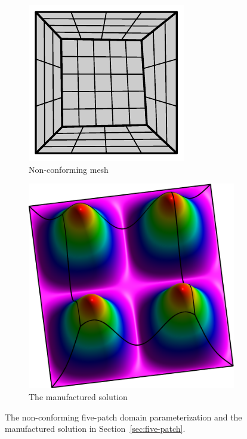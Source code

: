\begin{figure}[ht]
	\centering
	\begin{subfigure}[b]{0.33\textwidth}
		\includegraphics[width=\textwidth]{five_patch_basic}
		\caption{Non-conforming mesh}
	\end{subfigure}
	\begin{subfigure}[b]{0.34\textwidth}
		\includegraphics[width=\textwidth]{five_patch_solution-plot}
		\caption{The manufactured solution}
	\end{subfigure}
	\caption{The non-conforming five-patch domain parameterization and the manufactured solution in Section~\ref{sec:five-patch}.}\label{fig:five_patch_biharmonic_problem}
\end{figure}


